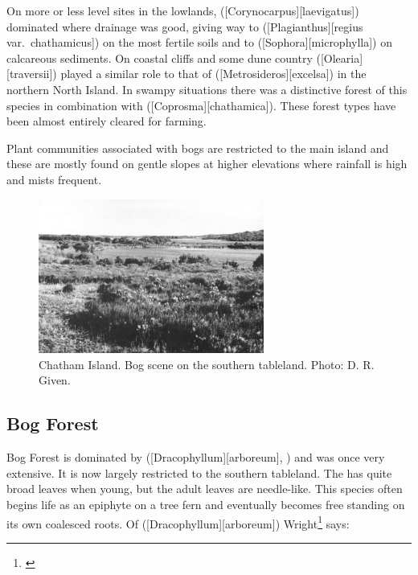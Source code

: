 On more or less level sites in the lowlands,  ([Corynocarpus][laevigatus]) dominated where drainage was good, giving way to  ([Plagianthus][regius var.\ chathamicus]) on the most fertile soils and to  ([Sophora][microphylla]) on calcareous sediments.
On coastal cliffs and some dune country  ([Olearia][traversii]) played a similar role to that of  ([Metrosideros][excelsa]) in the northern North Island.
In swampy situations there was a distinctive forest of this species in combination with  ([Coprosma][chathamica]).
These forest types have been almost entirely cleared for farming.

Plant communities associated with bogs are restricted to the main island and these are mostly found on gentle slopes at higher elevations where rainfall is high and mists frequent.

\begin{figure}
	\includegraphics[width=0.66\textwidth]{graphics/fig_119}
	\centering
	\caption[Chatham Island bog scene]{Chatham Island.
	Bog scene on the southern tableland.
	Photo: D. R. Given.}%
	\label{fig:119chatham-island-bog}
\end{figure}

\subsection{Bog Forest}

Bog Forest is dominated by  ([Dracophyllum][arboreum], ) and was once very extensive.
It is now largely restricted to the southern tableland.
The  has quite broad leaves when young, but the adult leaves are needle-like.
This species often begins life as an epiphyte on a tree fern and eventually becomes free standing on its own coalesced roots.
Of  ([Dracophyllum][arboreum]) Wright\footnote{\cite{wright1959soils}} says:

